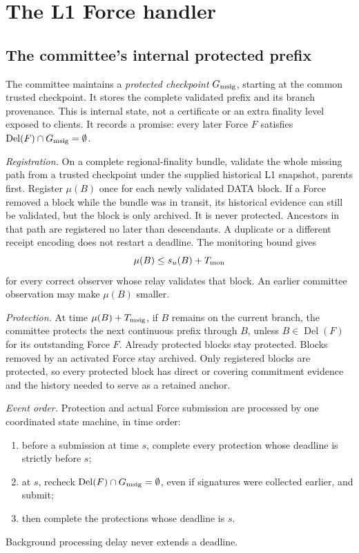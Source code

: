 \documentclass[11pt,a4paper]{article}
\newcommand{\Del}{\operatorname{Del}}
\newcommand{\defterm}[1]{\textcolor{rrBlue}{\textit{#1}}}
\begin{document}
\section{The L1 Force handler}
\label{sec:force}

\subsection{The committee's internal protected prefix}
\label{sec:protection}
The committee maintains a \defterm{protected checkpoint} $G_{\rm msig}$, starting
at the common trusted checkpoint. It stores the complete validated
prefix and its branch provenance. This is internal state, not a
certificate or an extra finality level exposed to clients.
It records a promise: every later Force $F$ satisfies
$\Del(F)\cap G_{\rm msig}=\emptyset$.

\emph{Registration.} On a complete regional-finality bundle, validate the whole missing path
from a trusted checkpoint under the supplied historical L1 snapshot,
parents first. Register $\mu(B)$ once for each newly validated DATA block.
If a Force removed a block while the bundle was in transit, its historical
evidence can still be validated, but the block is only archived. It is
never protected. Ancestors in that path are registered no
later than descendants. A duplicate or a different receipt encoding
does not restart a deadline. The monitoring bound gives
\[
 \mu(B)\le s_u(B)+T_{\rm mon}
\]
for every correct observer whose relay validates that block. An earlier
committee observation may make $\mu(B)$ smaller.

\emph{Protection.} At time $\mu(B)+T_{\rm msig}$, if $B$ remains on the current branch,
the committee protects the next continuous prefix through $B$, unless
$B\in\Del(F)$ for its outstanding Force $F$. Already protected blocks
stay protected. Blocks removed by an activated Force stay archived.
Only registered blocks are protected, so every protected block has direct or covering commitment
evidence and the history needed to serve as a retained anchor.

\emph{Event order.} Protection and actual Force submission
are processed by one coordinated state machine, in time order:
\begin{enumerate}[label=(\arabic*)]
\item before a submission at time $s$, complete every protection
whose deadline is strictly before $s$;
\item at $s$, recheck $\Del(F)\cap G_{\rm msig}=\emptyset$, even if
signatures were collected earlier, and submit;
\item then complete the protections whose deadline is $s$.
\end{enumerate}
Background processing delay never extends a deadline.
\end{document}
